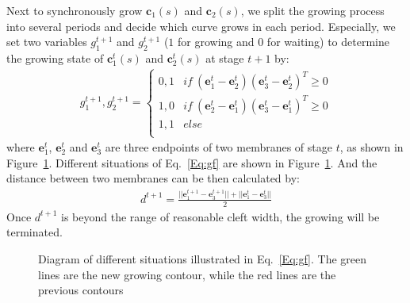 Next to synchronously grow $\mathbf{c}_1(s)$ and $\mathbf{c}_2(s)$, we split the growing process into several periods and decide which curve grows in each period.
Especially, we set two variables $g_1^{t+1}$ and $g_2^{t+1}$  ($1$ for growing and $0$ for waiting) to determine the growing state of $\mathbf{c}_1^{t}(s)$ and $\mathbf{c}_2^{t}(s)$ at stage $t+1$ by:
\begin{eqnarray}\label{Eq:gf}
g_1^{t+1},g_2^{t+1} = \left\{\begin{array}{cc}
0,1&if~(\mathbf{e}_1^t-\mathbf{e}_2^t)(\mathbf{e}_3^t-\mathbf{e}_2^t)^{T}\geq 0 \\
1,0&if~(\mathbf{e}_2^t-\mathbf{e}_1^t)(\mathbf{e}_3^t-\mathbf{e}_1^t)^{T}\geq 0\\
1,1& else\\
\end{array}\right.
\end{eqnarray}
where $\mathbf{e}_1^t$, $\mathbf{e}_2^t$ and $\mathbf{e}_3^t$ are three endpoints of two membranes of stage $t$, as shown in Figure~\ref{fig:sg}.
Different situations of Eq.~\ref{Eq:gf} are shown in Figure~\ref{fig:sg}.
And the distance between two membranes can be then calculated by:
\begin{eqnarray}\label{Eq:d}
d^{t+1} = \frac{||\mathbf{e}_1^{t+1}-\mathbf{e}_3^{t+1}||+ ||\mathbf{e}_1^{t}-\mathbf{e}_3^{t}||}{2}
\end{eqnarray}
Once $d^{t+1}$ is beyond the range of reasonable cleft width, the growing will be terminated.
\begin{figure}[t]
\begin{minipage}[b]{1.0\linewidth}
  \centering
 \centerline{}
\end{minipage}
\caption{Diagram of different situations illustrated in Eq.~\ref{Eq:gf}.
        The green lines are the new growing contour, while the red lines are the previous contours}
\label{fig:sg}
\end{figure}
